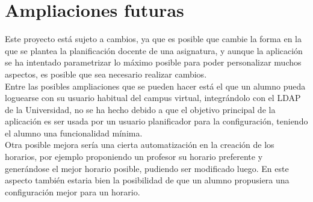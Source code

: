 \section{Ampliaciones futuras}

Este proyecto está sujeto a cambios, ya que es posible que cambie la forma en la que se plantea la planificación docente de una asignatura, y aunque la aplicación se ha intentado parametrizar lo máximo posible para poder personalizar muchos aspectos, es posible que sea necesario realizar cambios.\\

Entre las posibles ampliaciones que se pueden hacer está el que un alumno pueda loguearse con su usuario habitual del campus virtual, integrándolo con el LDAP de la Universidad, no se ha hecho debido a que el objetivo principal de la aplicación es ser usada por un usuario planificador para la configuración, teniendo el alumno una funcionalidad mínima.\\

Otra posible mejora sería una cierta automatización en la creación de los horarios, por ejemplo proponiendo un profesor su horario preferente y generándose el mejor horario posible, pudiendo ser modificado luego. En este aspecto también estaria bien la posibilidad de que un alumno propusiera una configuración mejor para un horario.


